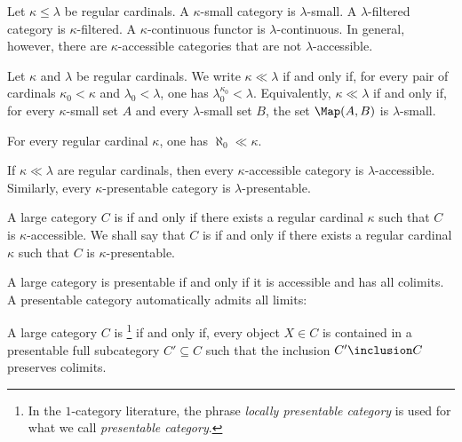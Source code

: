 \begin{nul}
	Let $ \kappa \leq \lambda $ be regular cardinals.
	A $ \kappa $-small category is $ \lambda $-small.
	A $ \lambda $-filtered category is $ \kappa $-filtered.
	A $ \kappa $-continuous functor is $ \lambda $-continuous.
	In general, however, there are $ \kappa $-accessible categories
	that are not $ \lambda $-accessible.
\end{nul}

\begin{definition}
	Let $ \kappa $ and $ \lambda $ be regular cardinals.
	We write $ \kappa \ll \lambda $ if and only if,
	for every pair of cardinals $ \kappa_0 < \kappa $ and $ \lambda_0 < \lambda $,
	one has $ \lambda_0^{\kappa_0} < \lambda $.
	Equivalently, $ \kappa \ll \lambda $ if and only if,
	for every $ \kappa $-small set $A$ and every $ \lambda $-small set $ B $,
	the set $ \Map(A, B) $ is $ \lambda $-small.
\end{definition}

\begin{eg}
	For every regular cardinal $ \kappa $, one has $ \aleph_0 \ll \kappa $.
\end{eg}

\begin{nul}
	If $ \kappa \ll \lambda $ are regular cardinals,
	then every $ \kappa $-accessible category is $ \lambda $-accessible.
	Similarly, every $ \kappa $-presentable category is $ \lambda $-presentable.
\end{nul}

\begin{definition}
	A large category $ C $ is  if and only if
	there exists a regular cardinal $ \kappa $ such that
	$ C $ is $ \kappa $-accessible.
	We shall say that $ C $ is  if and only if
	there exists a regular cardinal $ \kappa $ such that
	$ C $ is $ \kappa $-presentable.
\end{definition}

\begin{nul}
	A large category is presentable if and only if
	it is accessible and has all colimits.
	A presentable category automatically admits all limits:
\end{nul}

\begin{definition}
	A large category $ C $ is %
	\footnote{In the $1$-category literature,
		the phrase \emph{locally presentable category} is used for
	what we call \emph{presentable category}.}
	if and only if, every object $ X \in C $
	is contained in a presentable full subcategory $ C' \subseteq C $
	such that the inclusion $ C' \inclusion C $ preserves colimits.
\end{definition}

